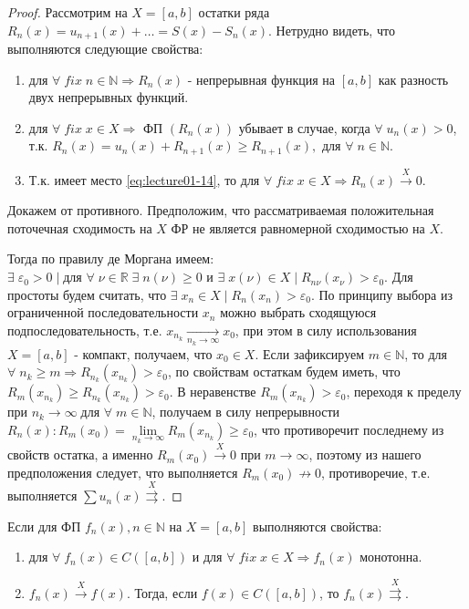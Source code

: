 \begin{proof}
	Рассмотрим на $X = [a,b]$ остатки ряда $R_n(x) = u_{n+1}(x) + \ldots = S(x) - S_n(x)$.	Нетрудно видеть, что выполняются следующие свойства:
	\begin{enumerate}
		\item для $\forall \; fix \; n \in \mathbb{N} \Rightarrow R_n (x)$ - непрерывная функция на $[a,b]$ как разность двух непрерывных функций.
		\item для $\forall \; fix \; x \in X \Rightarrow$ $\text{ФП}$ $(R_n(x))$ убывает в случае, когда $\forall \; u_n (x) > 0$, т.к. \newline $R_n(x) = u_n(x) + R_{n+1}(x) \geqslant R_{n+1}(x), \text{ для } \forall \; n \in \mathbb{N}$.
		\item Т.к. имеет место \eqref{eq:lecture01-14}, то для $\forall \; fix \; x \in X \Rightarrow R_n(x) \overset{X}{\to} 0$.
	\end{enumerate}
	Докажем от противного. Предположим, что рассматриваемая положительная поточечная сходимость на $X$ ФР не является равномерной сходимостью на $X$.

	Тогда по правилу де Моргана имеем: $\exists \; \varepsilon_0 > 0 \; | \; \text{для } \forall \; \nu \in \mathbb{R} \; \exists \; n (\nu) \geqslant 0 \text{ и } \exists \; x (\nu) \in X \; | \; R_{n \nu} (x_\nu) > \varepsilon_0$. Для простоты будем считать, что $\exists \; x_n \in X \; | \; R_n (x_n) > \varepsilon_0$. По принципу выбора из ограниченной последовательности $x_n$ можно выбрать сходящуюся подпоследовательность, т.е. $x_{n_k} \underset{n_k \to \infty}{\longrightarrow} x_0$, при этом в силу использования $X = [a,b]$ - компакт, получаем, что $x_0 \in X$. Если зафиксируем $m \in \mathbb{N}$, то для $\forall \; n_k \geqslant m \Rightarrow R_{n_k} (x_{n_k}) > \varepsilon_0$, по свойствам остаткам будем иметь, что $R_{m} (x_{n_k}) \geqslant R_{n_k} (x_{n_k}) > \varepsilon_0$. В неравенстве $R_m (x_{n_k}) > \varepsilon_0$, переходя к пределу при $n_k \to \infty \; \text{для } \forall \; m \in \mathbb{N}$, получаем в силу непрерывности $R_n(x): R_m (x_0) = \lim\limits_{n_k \to \infty} R_m(x_{n_k}) \geqslant \varepsilon_0$, что противоречит последнему из свойств остатка, а именно $R_m(x_0) \overset{X}{\longrightarrow} 0$ при $m \to \infty$, поэтому из нашего предположения следует, что выполняется $R_m(x_0) \not\to 0$, противоречие, т.е. выполняется $\sum u_n(x) \overset{X}{\rightrightarrows}$.
\end{proof}
\begin{consequence}
	Если для ФП $f_n(x), n \in \mathbb{N}$ на $X = [a,b]$ выполняются свойства:
	\begin{enumerate}
		\item для $\forall \; f_n(x) \in C([a,b])$ и для	 $\forall \; fix \; x \in X \Rightarrow f_n(x)$ монотонна.
		\item $f_n(x) 	\overset{X}{\longrightarrow}f(x)$. Тогда, если $f(x) \in C([a,b])$, то $f_n(x) \overset{X}{\rightrightarrows}$.
	\end{enumerate}
\end{consequence}
